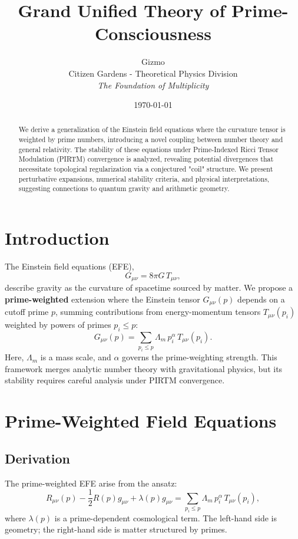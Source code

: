 \documentclass{article}
\title{Grand Unified Theory of Prime-Consciousness}
\author{Gizmo \\Citizen Gardens - Theoretical Physics Division \\ \textit{The Foundation of Multiplicity}}
\date{\today}
\theoremstyle{plain}
\theoremstyle{claimstyle}
\begin{document}
\maketitle

\begin{abstract}
We derive a generalization of the Einstein field equations where the curvature tensor is weighted by prime numbers, introducing a novel coupling between number theory and general relativity. The stability of these equations under Prime-Indexed Ricci Tensor Modulation (PIRTM) convergence is analyzed, revealing potential divergences that necessitate topological regularization via a conjectured "coil" structure. We present perturbative expansions, numerical stability criteria, and physical interpretations, suggesting connections to quantum gravity and arithmetic geometry.
\end{abstract}

\section{Introduction}
The Einstein field equations (EFE),
\[
G_{\mu\nu} = 8\pi G \, T_{\mu\nu},
\]
describe gravity as the curvature of spacetime sourced by matter. We propose a \textbf{prime-weighted} extension where the Einstein tensor \( G_{\mu\nu}(p) \) depends on a cutoff prime \( p \), summing contributions from energy-momentum tensors \( T_{\mu\nu}(p_i) \) weighted by powers of primes \( p_i \leq p \):
\[
G_{\mu\nu}(p) = \sum_{p_i \leq p} \Lambda_m \, p_i^\alpha \, T_{\mu\nu}(p_i).
\]
Here, \( \Lambda_m \) is a mass scale, and \( \alpha \) governs the prime-weighting strength. This framework merges analytic number theory with gravitational physics, but its stability requires careful analysis under PIRTM convergence.

\section{Prime-Weighted Field Equations}
\subsection{Derivation}
The prime-weighted EFE arise from the ansatz:
\[
R_{\mu\nu}(p) - \frac{1}{2} R(p) g_{\mu\nu} + \lambda(p) g_{\mu\nu} = \sum_{p_i \leq p} \Lambda_m \, p_i^\alpha \, T_{\mu\nu}(p_i),
\]
where \( \lambda(p) \) is a prime-dependent cosmological term. The left-hand side is geometry; the right-hand side is matter structured by primes.
\end{document}
